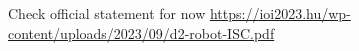 Check official statement for now \url{https://ioi2023.hu/wp-content/uploads/2023/09/d2-robot-ISC.pdf}